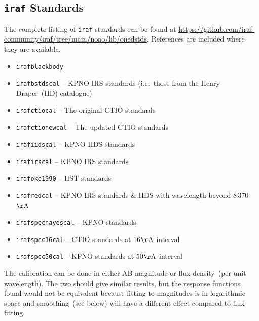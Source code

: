 \documentclass[linenumbers, twocolumn]{aastex631}
\begin{document}
\subsection*{\texttt{iraf} Standards}
The complete listing of \texttt{iraf} standards can be found at
\url{https://github.com/iraf-community/iraf/tree/main/noao/lib/onedstds}.
References are included where they are available.

\begin{itemize}
    \item \texttt{irafblackbody}
    \item \texttt{irafbstdscal} -- KPNO IRS standards (i.e.\ those from the Henry Draper~(HD) catalogue)
    \item \texttt{irafctiocal} -- The original CTIO standards \citet{1983MNRAS.204..347S, 1984MNRAS.206..241B}
    \item \texttt{irafctionewcal} -- The updated CTIO standards \citet{1992PASP..104..533H, 1994PASP..106..566H}
    \item \texttt{irafiidscal} -- KPNO IIDS standards \citet{1988ApJ...328..315M}
    \item \texttt{irafirscal} -- KPNO IRS standards \citet{1988ApJ...328..315M}
    \item \texttt{irafoke1990} -- HST standards \citet{1990AJ.....99.1621O}
    \item \texttt{irafredcal} -- KPNO IRS standards \& IIDS \citet{1988ApJ...328..315M} with wavelength beyond 8\,370\,$\mathrm{\AA}$
    \item \texttt{irafspechayescal} -- KPNO standards \citet{1988ApJ...328..315M}
    \item \texttt{irafspec16cal} -- CTIO standards \citet{1992PASP..104..533H, 1994PASP..106..566H} at 16$\mathrm{\AA}$ interval
    \item \texttt{irafspec50cal} -- KPNO standards \citet{1988ApJ...328..315M, 1990ApJ...358..344M} at 50$\mathrm{\AA}$ interval
\end{itemize}



The calibration can be done in either AB magnitude or
flux density~(per unit wavelength). The two should give similar
results, but the response functions found would not be equivalent
because fitting to magnitudes is in logarithmic space and smoothing~(see
below) will have a different effect compared to flux fitting.

\end{document}
